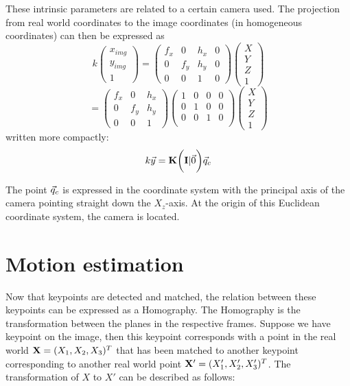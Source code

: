 These intrinsic parameters are related to a certain camera used. The projection from real world coordinates to the image coordinates (in homogeneous coordinates) can then be expressed as
\begin{equation}
    k\begin{pmatrix}
        x_{img}\\y_{img}\\1
    \end{pmatrix} = \begin{pmatrix}
        f_x & 0 & h_x & 0\\
        0 & f_y & h_y & 0\\
        0 & 0 & 1 & 0
    \end{pmatrix}\begin{pmatrix}
        X \\ Y \\ Z \\ 1
    \end{pmatrix}
\end{equation}
\begin{equation*}
    = \begin{pmatrix}
        f_x & 0 & h_x \\
        0 & f_y & h_y \\
        0 & 0 & 1
    \end{pmatrix}
    \begin{pmatrix}
        1 & 0 & 0 & 0\\
        0 & 1 & 0 & 0\\
        0 & 0 & 1 & 0\\
    \end{pmatrix}
    \begin{pmatrix}
        X \\ Y \\ Z \\ 1
    \end{pmatrix}
\end{equation*}
written more compactly:
\begin{equation}
    k\vec y = \mathbf{K} \biggl(\mathbf{I} \lvert \vec 0\biggr)\vec q_c
\end{equation}

The point $\vec q_c$ is expressed in the coordinate system with the principal axis of the camera pointing straight down the $X_z$-axis. At the origin of this Euclidean coordinate system, the camera is located.

\section{Motion estimation}
Now that keypoints are detected and matched, the relation between these keypoints can be expressed as a Homography. The Homography is the transformation between the planes in the respective frames. Suppose we have keypoint on the image, then this keypoint corresponds with a point in the real world $\mathbf{X} = (X_1, X_2, X_3)^T$ that has been matched to another keypoint corresponding to another real world point $\mathbf{X}' = (X_1', X_2', X_3')^T$. The transformation of $X$ to $X'$ can be described as follows: 

